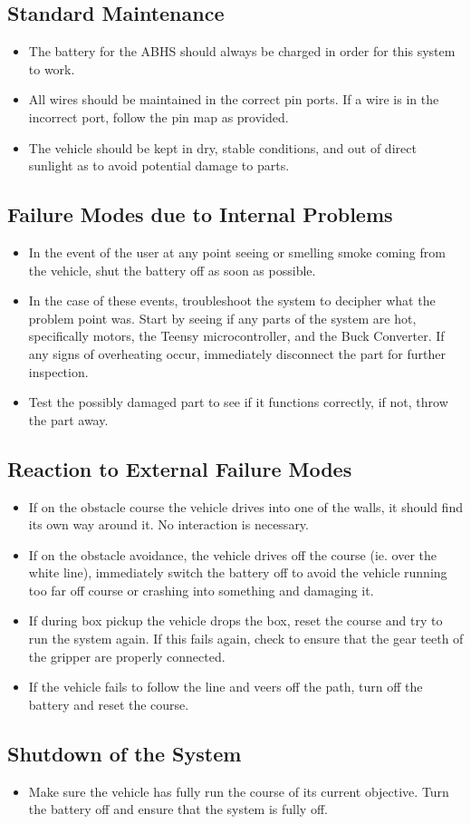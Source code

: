 \documentclass{article}
\begin{document}
\subsection{Standard Maintenance}
\begin{itemize}
    \item The battery for the ABHS should always be charged in order for this system to work.
    \item All wires should be maintained in the correct pin ports. If a wire is in the incorrect port, follow the pin map as provided.
    \item The vehicle should be kept in dry, stable conditions, and out of direct sunlight as to avoid potential damage to parts.
\end{itemize}
\subsection{Failure Modes due to Internal Problems}
\begin{itemize}
    \item In the event of the user at any point seeing or smelling smoke coming from the vehicle, shut the battery off as soon as possible. 
    \item In the case of these events, troubleshoot the system to decipher what the problem point was. Start by seeing if any parts of the system are hot, specifically motors, the Teensy microcontroller, and the Buck Converter. If any signs of overheating occur, immediately disconnect the part for further inspection.
    \item Test the possibly damaged part to see if it functions correctly, if not, throw the part away.
\end{itemize}
\subsection{Reaction to External Failure Modes}
\begin{itemize}
    \item If on the obstacle course the vehicle drives into one of the walls, it should find its own way around it. No interaction is necessary. 
    \item If on the obstacle avoidance, the vehicle drives off the course (ie. over the white line), immediately switch the battery off to avoid the vehicle running too far off course or crashing into something and damaging it.
    \item If during box pickup the vehicle drops the box, reset the course and try to run the system again. If this fails again, check to ensure that the gear teeth of the gripper are properly connected.
    \item If the vehicle fails to follow the line and veers off the path, turn off the battery and reset the course. 
\end{itemize}
\subsection{Shutdown of the System}
\begin{itemize}
    \item Make sure the vehicle has fully run the course of its current objective. Turn the battery off and ensure that the system is fully off.
\end{itemize}
\end{document}

